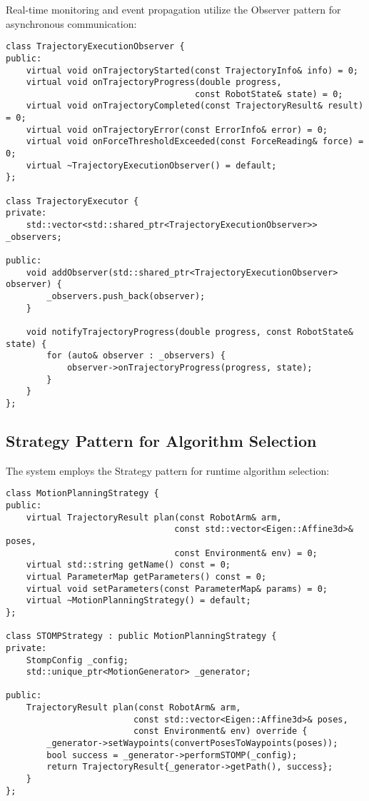 Real-time monitoring and event propagation utilize the Observer pattern for asynchronous communication:

\begin{lstlisting}[caption={Observer Pattern for Trajectory Monitoring}, label={lst:observer_pattern}]
class TrajectoryExecutionObserver {
public:
    virtual void onTrajectoryStarted(const TrajectoryInfo& info) = 0;
    virtual void onTrajectoryProgress(double progress, 
                                     const RobotState& state) = 0;
    virtual void onTrajectoryCompleted(const TrajectoryResult& result) = 0;
    virtual void onTrajectoryError(const ErrorInfo& error) = 0;
    virtual void onForceThresholdExceeded(const ForceReading& force) = 0;
    virtual ~TrajectoryExecutionObserver() = default;
};

class TrajectoryExecutor {
private:
    std::vector<std::shared_ptr<TrajectoryExecutionObserver>> _observers;
    
public:
    void addObserver(std::shared_ptr<TrajectoryExecutionObserver> observer) {
        _observers.push_back(observer);
    }
    
    void notifyTrajectoryProgress(double progress, const RobotState& state) {
        for (auto& observer : _observers) {
            observer->onTrajectoryProgress(progress, state);
        }
    }
};
\end{lstlisting}

\subsection{Strategy Pattern for Algorithm Selection}

The system employs the Strategy pattern for runtime algorithm selection:

\begin{lstlisting}[caption={Strategy Pattern for Motion Planning}, label={lst:strategy_pattern}]
class MotionPlanningStrategy {
public:
    virtual TrajectoryResult plan(const RobotArm& arm,
                                 const std::vector<Eigen::Affine3d>& poses,
                                 const Environment& env) = 0;
    virtual std::string getName() const = 0;
    virtual ParameterMap getParameters() const = 0;
    virtual void setParameters(const ParameterMap& params) = 0;
    virtual ~MotionPlanningStrategy() = default;
};

class STOMPStrategy : public MotionPlanningStrategy {
private:
    StompConfig _config;
    std::unique_ptr<MotionGenerator> _generator;
    
public:
    TrajectoryResult plan(const RobotArm& arm,
                         const std::vector<Eigen::Affine3d>& poses,
                         const Environment& env) override {
        _generator->setWaypoints(convertPosesToWaypoints(poses));
        bool success = _generator->performSTOMP(_config);
        return TrajectoryResult{_generator->getPath(), success};
    }
};
\end{lstlisting}

